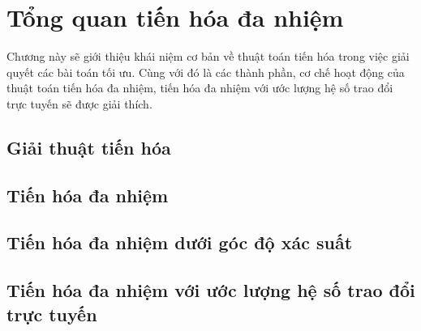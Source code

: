 \chapter{Tổng quan tiến hóa đa nhiệm}
\label{chap:introduction}
Chương này sẽ giới thiệu khái niệm cơ bản về thuật toán tiến hóa trong việc giải quyết các bài toán tối ưu. Cùng với đó là các thành phần, cơ chế hoạt động của thuật toán tiến hóa đa nhiệm, tiến hóa đa nhiệm với ước lượng hệ số trao đổi trực tuyến sẽ được giải thích.
\section{Giải thuật tiến hóa}

\section{Tiến hóa đa nhiệm} 

\section{Tiến hóa đa nhiệm dưới góc độ xác suất}

\section{Tiến hóa đa nhiệm với ước lượng hệ số trao đổi trực tuyến}
\label{section:mfeaii}
